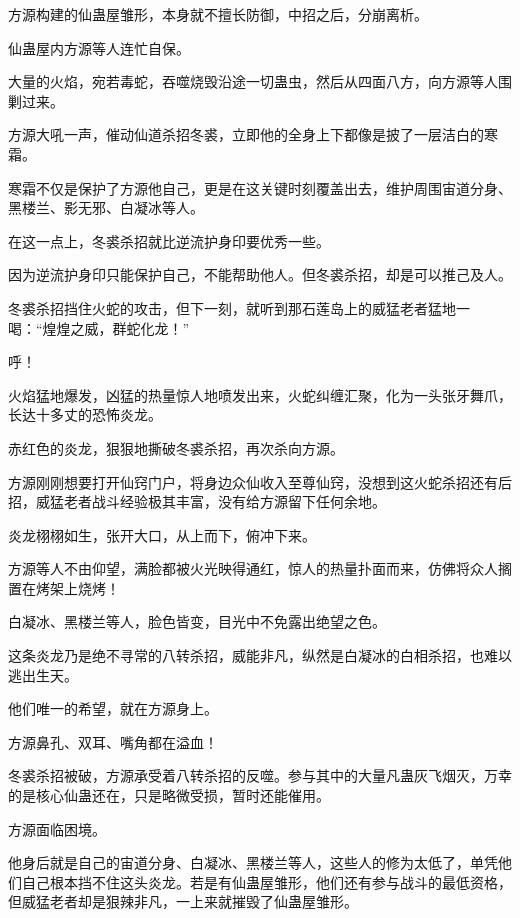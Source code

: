 
\begin{this_body}

方源构建的仙蛊屋雏形，本身就不擅长防御，中招之后，分崩离析。

仙蛊屋内方源等人连忙自保。

大量的火焰，宛若毒蛇，吞噬烧毁沿途一切蛊虫，然后从四面八方，向方源等人围剿过来。

方源大吼一声，催动仙道杀招冬裘，立即他的全身上下都像是披了一层洁白的寒霜。

寒霜不仅是保护了方源他自己，更是在这关键时刻覆盖出去，维护周围宙道分身、黑楼兰、影无邪、白凝冰等人。

在这一点上，冬裘杀招就比逆流护身印要优秀一些。

因为逆流护身印只能保护自己，不能帮助他人。但冬裘杀招，却是可以推己及人。

冬裘杀招挡住火蛇的攻击，但下一刻，就听到那石莲岛上的威猛老者猛地一喝：“煌煌之威，群蛇化龙！”

呼！

火焰猛地爆发，凶猛的热量惊人地喷发出来，火蛇纠缠汇聚，化为一头张牙舞爪，长达十多丈的恐怖炎龙。

赤红色的炎龙，狠狠地撕破冬裘杀招，再次杀向方源。

方源刚刚想要打开仙窍门户，将身边众仙收入至尊仙窍，没想到这火蛇杀招还有后招，威猛老者战斗经验极其丰富，没有给方源留下任何余地。

炎龙栩栩如生，张开大口，从上而下，俯冲下来。

方源等人不由仰望，满脸都被火光映得通红，惊人的热量扑面而来，仿佛将众人搁置在烤架上烧烤！

白凝冰、黑楼兰等人，脸色皆变，目光中不免露出绝望之色。

这条炎龙乃是绝不寻常的八转杀招，威能非凡，纵然是白凝冰的白相杀招，也难以逃出生天。

他们唯一的希望，就在方源身上。

方源鼻孔、双耳、嘴角都在溢血！

冬裘杀招被破，方源承受着八转杀招的反噬。参与其中的大量凡蛊灰飞烟灭，万幸的是核心仙蛊还在，只是略微受损，暂时还能催用。

方源面临困境。

他身后就是自己的宙道分身、白凝冰、黑楼兰等人，这些人的修为太低了，单凭他们自己根本挡不住这头炎龙。若是有仙蛊屋雏形，他们还有参与战斗的最低资格，但威猛老者却是狠辣非凡，一上来就摧毁了仙蛊屋雏形。


\end{this_body}
